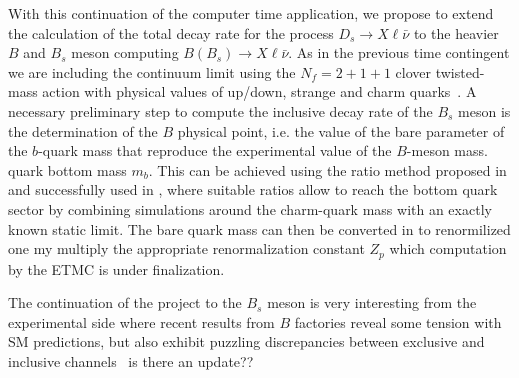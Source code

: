 With this continuation of the computer time application, we propose to extend
the calculation of the total decay rate for the process $D_s \to X\ell\bar\nu$ to the
heavier $B$ and $B_s$ meson computing  $B (B_s) \to X\ell\bar\nu$.
As in the previous time contingent we are including the continuum limit
using the $N_f=2+1+1$ clover twisted-mass action with physical
values of up/down, strange and charm
quarks~\cite{ExtendedTwistedMass:2021qui,ExtendedTwistedMass:2021gbo,ExtendedTwistedMass:2022jpw}.
A necessary preliminary step to compute the inclusive decay rate of the $B_s$
meson is the determination of the 
$B$ physical point, i.e. the value of the bare parameter of the $b$-quark mass that reproduce the
experimental value of the $B$-meson mass.  
quark bottom mass $m_b$. This can be
achieved using the ratio method proposed in \cite{ETM:2009sed}
and successfully used in \cite{ETM:2016nbo}, where suitable ratios allow
to reach the bottom quark sector by combining simulations around the
charm-quark mass with an exactly known static limit.
The bare quark mass can then be converted in to renormilized one my multiply 
the appropriate renormalization constant $Z_p$ which computation by the ETMC 
is under finalization.


The continuation of the project to the $B_s$ meson is very interesting from the
experimental side  where recent results from $B$ factories reveal some tension with
SM predictions, but also exhibit puzzling discrepancies between exclusive and
inclusive channels~\cite{ParticleDataGroup:2020ssz, HFLAV:2019otj, Gambino:2019sif}
{\color{red} is there an update??}


